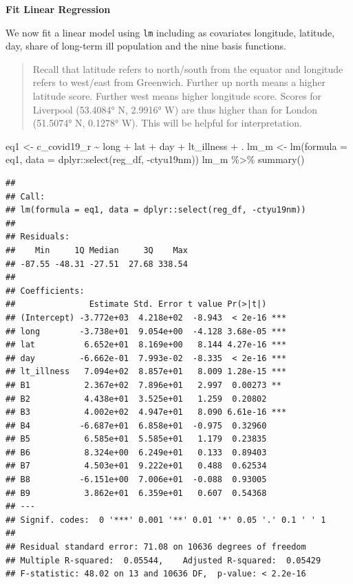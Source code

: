 \documentclass[
]{book}
\newenvironment{Shaded}{\begin{snugshade}}{\end{snugshade}}
\newcommand{\AttributeTok}[1]{\textcolor[rgb]{0.77,0.63,0.00}{#1}}
\newcommand{\FunctionTok}[1]{\textcolor[rgb]{0.00,0.00,0.00}{#1}}
\newcommand{\NormalTok}[1]{#1}
\newcommand{\OtherTok}[1]{\textcolor[rgb]{0.56,0.35,0.01}{#1}}
\newcommand{\SpecialCharTok}[1]{\textcolor[rgb]{0.00,0.00,0.00}{#1}}
\begin{document}
\textbf{Fit Linear Regression}

We now fit a linear model using \texttt{lm} including as covariates longitude, latitude, day, share of long-term ill population and the nine basis functions.

\begin{quote}
Recall that latitude refers to north/south from the equator and longitude refers to west/east from Greenwich. Further up north means a higher latitude score. Further west means higher longitude score. Scores for Liverpool (53.4084° N, 2.9916° W) are thus higher than for London (51.5074° N, 0.1278° W). This will be helpful for interpretation.
\end{quote}

\begin{Shaded}
\begin{Highlighting}[]
\NormalTok{eq1 }\OtherTok{\textless{}{-}}\NormalTok{ c\_covid19\_r }\SpecialCharTok{\textasciitilde{}}\NormalTok{ long }\SpecialCharTok{+}\NormalTok{ lat }\SpecialCharTok{+}\NormalTok{ day }\SpecialCharTok{+}\NormalTok{ lt\_illness }\SpecialCharTok{+}\NormalTok{ .}
\NormalTok{lm\_m }\OtherTok{\textless{}{-}} \FunctionTok{lm}\NormalTok{(}\AttributeTok{formula =}\NormalTok{ eq1, }
           \AttributeTok{data =}\NormalTok{ dplyr}\SpecialCharTok{::}\FunctionTok{select}\NormalTok{(reg\_df, }\SpecialCharTok{{-}}\NormalTok{ctyu19nm))}
\NormalTok{lm\_m }\SpecialCharTok{\%\textgreater{}\%} \FunctionTok{summary}\NormalTok{()}
\end{Highlighting}
\end{Shaded}

\begin{verbatim}
## 
## Call:
## lm(formula = eq1, data = dplyr::select(reg_df, -ctyu19nm))
## 
## Residuals:
##    Min     1Q Median     3Q    Max 
## -87.55 -48.31 -27.51  27.68 338.54 
## 
## Coefficients:
##               Estimate Std. Error t value Pr(>|t|)    
## (Intercept) -3.772e+03  4.218e+02  -8.943  < 2e-16 ***
## long        -3.738e+01  9.054e+00  -4.128 3.68e-05 ***
## lat          6.652e+01  8.169e+00   8.144 4.27e-16 ***
## day         -6.662e-01  7.993e-02  -8.335  < 2e-16 ***
## lt_illness   7.094e+02  8.857e+01   8.009 1.28e-15 ***
## B1           2.367e+02  7.896e+01   2.997  0.00273 ** 
## B2           4.438e+01  3.525e+01   1.259  0.20802    
## B3           4.002e+02  4.947e+01   8.090 6.61e-16 ***
## B4          -6.687e+01  6.858e+01  -0.975  0.32960    
## B5           6.585e+01  5.585e+01   1.179  0.23835    
## B6           8.324e+00  6.249e+01   0.133  0.89403    
## B7           4.503e+01  9.222e+01   0.488  0.62534    
## B8          -6.151e+00  7.006e+01  -0.088  0.93005    
## B9           3.862e+01  6.359e+01   0.607  0.54368    
## ---
## Signif. codes:  0 '***' 0.001 '**' 0.01 '*' 0.05 '.' 0.1 ' ' 1
## 
## Residual standard error: 71.08 on 10636 degrees of freedom
## Multiple R-squared:  0.05544,    Adjusted R-squared:  0.05429 
## F-statistic: 48.02 on 13 and 10636 DF,  p-value: < 2.2e-16
\end{verbatim}
\end{document}
